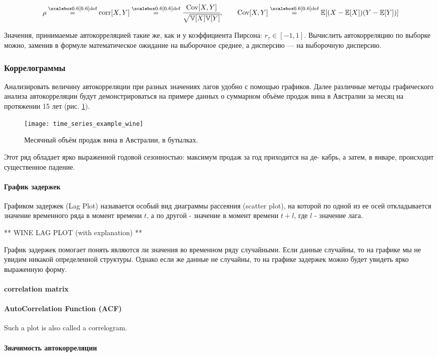 \begin{equation*}
    \rho \defeq \text{corr}[X, Y] \defeq 
    \cfrac{\text{Cov}[X, Y]}{\sqrt{\mathbb{V}[X]\mathbb{V}[Y]}}, \qquad 
    \text{Cov}[X, Y] \defeq \mathbb{E}[(X - \mathbb{E}[X])(Y - \mathbb{E}[Y])]
\end{equation*}

Значения, принимаемые автокорреляцией такие же, как и у коэффициента 
Пирсона: $r_\tau \in [-1, 1]$. Вычислить автокорреляцию по выборке можно, заменив в формуле 
математическое ожидание на выборочное среднее, а дисперсию — на выборочную дисперсию.

\subsubsection{Коррелограммы}
Анализировать величину автокорреляции при разных значениях лагов удобно с помощью графиков. 
Далее различные методы графического анализа автокорреляции будут демонстрироваться 
на примере данных о суммарном объёме продаж вина в Австралии за
месяц на протяжении 15 лет (рис. \ref{fig:time_series_wine}).

\begin{figure}[h!]
    \centering
    \texttt{[image: time\_series\_example\_wine]}
    \caption{Месячный объём продаж вина в Австралии, в бутылках.}
    \label{fig:time_series_wine}
\end{figure}

Этот ряд обладает ярко выраженной годовой сезонностью: максимум продаж за год приходится на де-
кабрь, а затем, в январе, происходит существенное падение.

\paragraph{График задержек}
Графиком задержек (Lag Plot) называется особый вид диаграммы рассеяния (scatter plot), 
на которой по одной из ее осей откладывается значение временного ряда в момент времени 
$t$, а по другой - значение в момент времени $t + l$, где $l$ - значение лага.

** WINE LAG PLOT (with explanation) **

График задержек помогает понять являются ли значения во временном ряду случайными. Если 
данные случайны, то на графике мы не увидим никакой определенной структуры. Однако 
если же данные не случайны, то на графике задержек можно будет увидеть ярко 
выраженную форму. 

\paragraph{correlation matrix}

\paragraph{AutoCorrelation Function (ACF)}
Such a plot is also called a correlogram.

\paragraph{Значимость автокорреляции}

